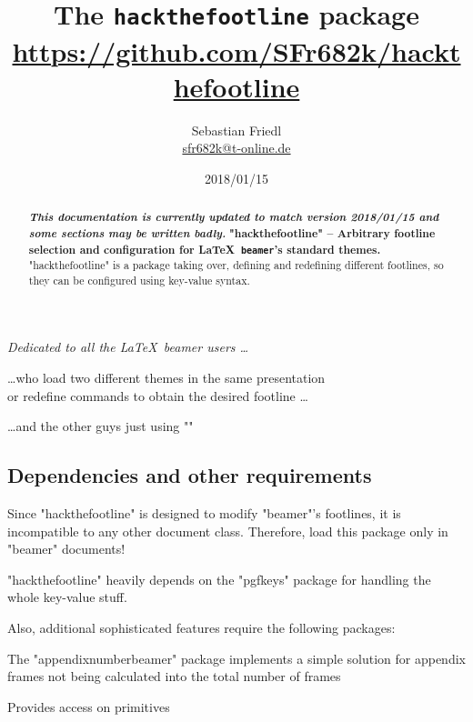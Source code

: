 \documentclass[11pt]{ltxdoc}
\title{The \texttt{\bfseries hackthefootline} package \\ {\large\url{https://github.com/SFr682k/hackthefootline}}}
\author{Sebastian Friedl \\ \href{mailto:sfr682k@t-online.de}{\ttfamily sfr682k@t-online.de}}
\date{2018/01/15}
\begin{document}
	\maketitle
	\thispagestyle{empty}
	
	\begin{center} \itshape
		Dedicated to all the \LaTeX\ beamer users \dots
		
		\medskip
		\dots who load two different themes in the same presentation \\ or redefine commands to obtain the desired footline \dots
		
		\medskip
		\dots and the other guys just using "\setbeamertemplate"
	\end{center}
	
	\medskip
	\begin{abstract}
		\noindent%
		\textbf{\itshape\color{red} This documentation is currently updated to match version 2018/01/15 and some sections may be written badly.}
		\textbf{"hackthefootline" -- Arbitrary footline selection and configuration for \LaTeX\ \texttt{beamer}'s standard themes.}
		"hackthefootline" is a package taking over, defining and redefining different footlines, so they can be configured using key-value syntax.
	\end{abstract}
	
	
	\tableofcontents
	
	\clearpage
	
	
	
	\subsection*{Dependencies and other requirements}
	Since "hackthefootline" is designed to modify "beamer"'s footlines, it is incompatible to any other document class. Therefore, load this package only in "beamer" documents!
	
	\medskip
	"hackthefootline" heavily depends on the "pgfkeys" package for handling the whole key-value stuff.
	
	\bigskip
	Also, additional sophisticated features require the following packages:
	
	\medskip
	The "appendixnumberbeamer" package implements a simple solution for appendix frames not being calculated into the total number of frames
	
	\medskip
	Provides access on  primitives
	
\end{document}
